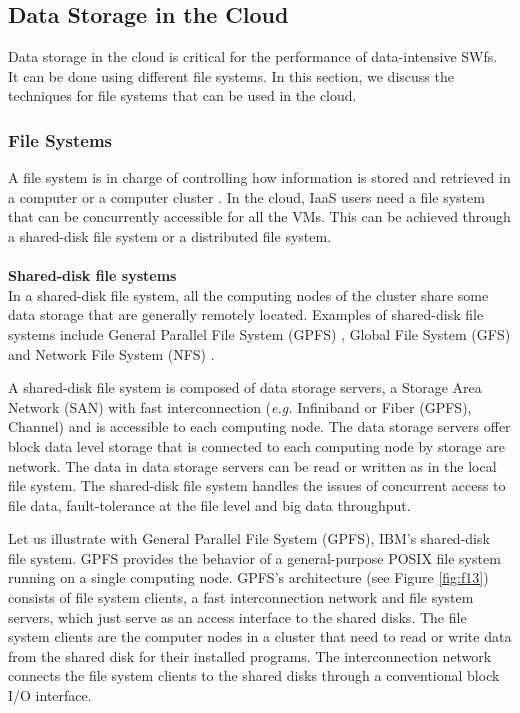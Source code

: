 \subsection{Data Storage in the Cloud}

Data storage in the cloud is critical for the performance of
data-intensive SWfs. 
It can be done using different file systems.
In this section, we discuss the techniques for file systems that can be used in the cloud.


\subsubsection{File Systems}
\label{sec:subsub:FS}

A file system is in charge of controlling how information is stored
and retrieved in a computer or a computer cluster \cite{Arkoudas2004}.
In the cloud, IaaS users need a file system that can be concurrently accessible for
all the VMs.
This can be achieved through a shared-disk file system or a
distributed file system.\\
\\
\textbf{Shared-disk file systems}\\
In a shared-disk file system, all the computing nodes of the cluster share some data
storage that are generally remotely located. Examples of
shared-disk file systems include General Parallel File System (GPFS) \cite{Schmuck2002},
Global File System (GFS) \cite{Preslan1999} and Network File System (NFS) \cite{Sandberg1988}.

A shared-disk file system is composed of data storage servers, a Storage
Area Network (SAN) with fast interconnection (\textit{e.g.} Infiniband or Fiber (GPFS),
Channel)
and is accessible to each computing node. The data
storage servers offer block data level storage that is connected to
each computing node by storage are network. The data in data storage
servers can be read or written as in the local file system.
The shared-disk file system handles the issues of concurrent
access to file data, fault-tolerance at the file level and big data throughput. 

Let us illustrate with General Parallel File
System (GPFS), IBM\textquoteright{}s shared-disk file system. 
GPFS provides the behavior of a general-purpose
POSIX file system running on a single computing node.
 GPFS\textquoteright{}s architecture (see Figure \ref{fig:f13})
consists of file system clients, a fast interconnection network and file system servers, which just
serve as an access interface to the shared disks. The file system
clients are the computer nodes in a cluster that need to read or write
data from the shared disk for their installed programs. The
interconnection network connects the file system clients to the shared disks through
a conventional block I/O interface. 

